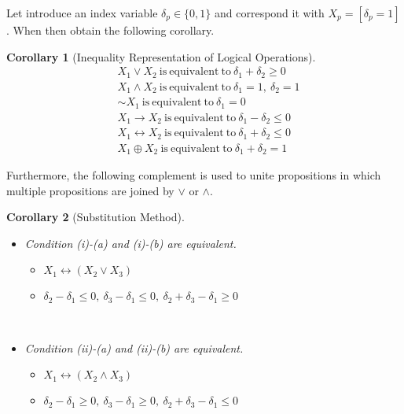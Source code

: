\documentclass[]{interact}
\theoremstyle{plain}%
\newtheorem{theorem}{Theorem}[section]
\newtheorem{corollary}[theorem]{Corollary}
\theoremstyle{definition}
\theoremstyle{remark}
\begin{document}
Let introduce an index variable $\delta_p\in\{0,1\}$ and correspond it with $X_p=[\delta_p=1]$.
When then obtain the following corollary.
\begin{corollary}[Inequality Representation of Logical Operations]
    \label{col:Inequality}
    \begin{align}
        &X_1\vee X_2~\mathrm{is~equivalent~to}~\delta_1 + \delta_2 \ge 0\\
        &X_1\wedge X_2~\mathrm{is~equivalent~to}~\delta_1=1,~\delta_2=1\\
        &\sim X_1~\mathrm{is~equivalent~to}~\delta_1 = 0\\
        &X_1\rightarrow X_2~\mathrm{is~equivalent~to}~\delta_1 - \delta_2 \le 0\\
        &X_1\leftrightarrow X_2~\mathrm{is~equivalent~to}~\delta_1 + \delta_2 \le 0\\
        &X_1\oplus X_2~\mathrm{is~equivalent~to}~\delta_1 + \delta_2 = 1
    \end{align}
\end{corollary}
Furthermore, the following complement is used to unite propositions in which multiple propositions are joined by $\vee$ or $\wedge$.
\begin{corollary}[Substitution Method]\mbox{}\\
    \label{col:Substitution}
    \begin{itemize}
        \item[(i)] Condition (i)-(a) and (i)-(b) are equivalent.\mbox{}\\
            \begin{itemize}
                \item[(a)]$X_1\leftrightarrow(X_2\vee X_3)$\\
                \item[(b)] $\delta_2-\delta_1\le 0,~\delta_3-\delta_1\le 0,~\delta_2+\delta_3-\delta_1\ge 0$
            \end{itemize}
            \mbox{}\\
        \item[(ii)] Condition (ii)-(a) and (ii)-(b) are equivalent.\mbox{}\\
            \begin{itemize}
                \item[(a)]$X_1\leftrightarrow(X_2\wedge X_3)$\\
                \item[(b)] $\delta_2-\delta_1\ge 0,~\delta_3-\delta_1\ge 0,~\delta_2+\delta_3-\delta_1\le 0$
            \end{itemize}
            \mbox{}\\
    \end{itemize}
\end{corollary}
\end{document}
